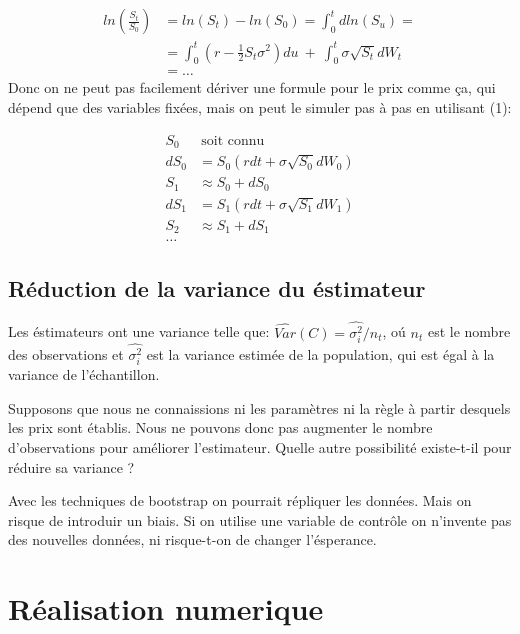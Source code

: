 \documentclass[a4paper,12pt]{scrartcl}
\begin{document}
\begin{align*}
ln( \frac{S_t}{S_0} ) 
&= ln(S_t)-ln(S_0) = \int_0^t dln(S_u) = \\
&= \int_0^t (r-\frac{1}{2} S_t \sigma^2)du~+~\int_0^t \sigma \sqrt{S_t}dW_t \\
&=\dots
\end{align*}
Donc on ne peut pas facilement dériver une formule pour le prix comme ça, qui dépend que des variables fixées, mais on peut le simuler pas à pas en utilisant (1):

\begin{equation} \label{6}
\begin{split}
S_0  &~\text{soit connu} \\
dS_0 &= S_0(rdt + \sigma \sqrt{S_0} dW_0) \\
S_1  &\approx S_0 + dS_0 \\
dS_1 &= S_1(rdt + \sigma \sqrt{S_1} dW_1) \\
S_2  &\approx S_1 + dS_1 \\
\dots
\end{split}
\end{equation}



\subsection{Réduction de la variance du éstimateur}

Les éstimateurs ont une variance telle que:
$ \hat{Var}(C) = \hat{\sigma_i^2} / n_t$, oú $n_t$ est le nombre des observations et $\hat{\sigma_i^2}$ est la variance estimée de la population, qui est égal à la variance de l'échantillon.

Supposons que nous ne connaissions ni les paramètres ni la règle à partir desquels les prix sont établis. 
Nous ne pouvons donc pas augmenter le nombre d'observations pour améliorer l'estimateur.
Quelle autre possibilité existe-t-il pour réduire sa variance ?

Avec les techniques de bootstrap on pourrait répliquer les données. 
Mais on risque de introduir un biais.
Si on utilise une variable de contrôle on n'invente pas des nouvelles données, ni risque-t-on de changer l'ésperance.


\section{Réalisation numerique}
\end{document}
